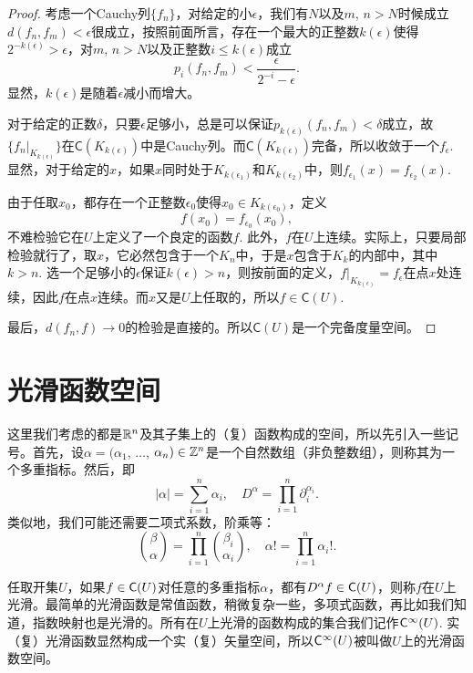 \begin{proof}
考虑一个Cauchy列$\{f_n\}$，对给定的小$\epsilon$，我们有$N$以及$m$, $n>N$时候成立$d(f_n,f_m)<\epsilon$很成立，按照前面所言，存在一个最大的正整数$k(\epsilon)$使得$2^{-k(\epsilon)}>\epsilon$，对$m$, $n>N$以及正整数$i\leq k(\epsilon)$成立
\[
	p_i(f_n,f_m)<\frac{\epsilon}{2^{-i}-\epsilon}.
\]
显然，$k(\epsilon)$是随着$\epsilon$减小而增大。

对于给定的正数$\delta$，只要$\epsilon$足够小，总是可以保证$p_{k(\epsilon)}(f_n,f_m)<\delta$成立，故$\{f_n|_{K_{k(\epsilon)}}\}$在$\mathsf{C}(K_{k(\epsilon)})$中是Cauchy列。而$\mathsf{C}(K_{k(\epsilon)})$完备，所以收敛于一个$f_\epsilon$. 显然，对于给定的$x$，如果$x$同时处于$K_{k(\epsilon_1)}$和$K_{k(\epsilon_2)}$中，则$f_{\epsilon_1}(x)=f_{\epsilon_2}(x)$.

由于任取$x_0$，都存在一个正整数$\epsilon_0$使得$x_0\in K_{k(\epsilon_0)}$，定义
\[
	f(x_0)=f_{\epsilon_0}(x_0),
\]
不难检验它在$U$上定义了一个良定的函数$f$. 此外，$f$在$U$上连续。实际上，只要局部检验就行了，取$x$，它必然包含于一个$K_n$中，于是$x$包含于$K_{k}$的内部中，其中$k>n$. 选一个足够小的$\epsilon$保证$k(\epsilon)>n$，则按前面的定义，$f|_{K_{k(\epsilon)}}=f_{\epsilon}$在点$x$处连续，因此$f$在点$x$连续。而$x$又是$U$上任取的，所以$f\in \mathsf{C} (U)$.

最后，$d(f_n,f)\to 0$的检验是直接的。所以$\mathsf{C}(U)$是一个完备度量空间。
\end{proof}

\section{光滑函数空间}

这里我们考虑的都是$\mathbb{R}^n$及其子集上的（复）函数构成的空间，所以先引入一些记号。首先，设$\alpha=(\alpha_1$, $\dots$, $\alpha_n)\in \mathbb{Z}^n$是一个自然数组（非负整数组），则称其为一个多重指标。然后，即
\[
	|\alpha|=\sum_{i=1}^n\alpha_i,\quad D^\alpha=\prod_{i=1}^n \partial_i^{\alpha_i}.
\]
类似地，我们可能还需要二项式系数，阶乘等：
\[
	\binom{\beta}{\alpha}=\prod_{i=1}^n\binom{\beta_i}{\alpha_i},\quad \alpha!=\prod_{i=1}^n \alpha_i!.
\]

\begin{para}[光滑函数空间]
任取开集$U$，如果$f\in \mathsf{C}(U)$对任意的多重指标$\alpha$，都有$D^\alpha f\in \mathsf{C}(U)$，则称$f$在$U$上光滑。最简单的光滑函数是常值函数，稍微复杂一些，多项式函数，再比如我们知道，指数映射也是光滑的。所有在$U$上光滑的函数构成的集合我们记作$\mathsf{C}^\infty(U)$. 实（复）光滑函数显然构成一个实（复）矢量空间，所以$\mathsf{C}^\infty(U)$被叫做$U$上的光滑函数空间。
\end{para}

